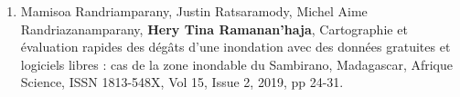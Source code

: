 \begin{enumerate}
\item	Mamisoa Randriamparany, Justin Ratsaramody, Michel Aime Randriazanamparany, \textbf{Hery Tina Ramanan’haja}, Cartographie et évaluation rapides des dégâts d’une inondation avec des données gratuites et logiciels libres : cas de la zone inondable du Sambirano, Madagascar, Afrique Science, ISSN 1813-548X, Vol 15, Issue 2, 2019, pp 24-31.
	
\end{enumerate}

